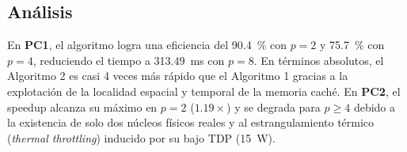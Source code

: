 \subsection{Análisis}
En \textbf{PC1}, el algoritmo logra una eficiencia del \SI{90.4}{\percent} con $p=2$ y \SI{75.7}{\percent} con $p=4$, reduciendo el tiempo a \SI{313.49}{\milli\second} con $p=8$. En términos absolutos, el Algoritmo 2 es casi 4 veces más rápido que el Algoritmo 1 gracias a la explotación de la localidad espacial y temporal de la memoria caché. En \textbf{PC2}, el speedup alcanza su máximo en $p=2$ ($1.19\times$) y se degrada para $p \ge 4$ debido a la existencia de solo dos núcleos físicos reales y al estrangulamiento térmico (\emph{thermal throttling}) inducido por su bajo TDP (\SI{15}{\watt}).
